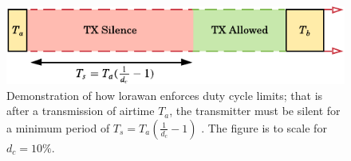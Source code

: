 \begin{figure}[H]
    \centering
   	\includegraphics{Figures/duty_cycle_lorawan.pdf}
    \caption[\ac{lorawan} duty cycle enforcement]{
    Demonstration of how \ac{lorawan} enforces duty cycle limits; that is after a transmission of airtime $T_a$, the transmitter must be silent for a minimum period of $T_s=T_a(\frac{1}{d_c}-1)$ \cite{3YP:LIMITS_OF_LORAWAN}. The figure is to scale for $d_c=10\%$.
    }
    \label{fig:lorawan_duty_cycles}
\end{figure}